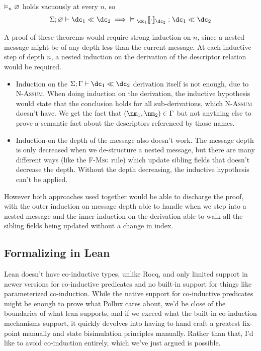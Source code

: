 \vspace{1em}
\begin{corollary}\label{cor:compat-sound}
  $\semjudg[n]{\emptyset}$ holds vacuously at every $n$, so
  \[ \judg{\emptyset}{\dc_1 \dcompat \dc_2} \implies\ \semjudg{ \coercion{\dc_1}{\cdot}{\dc_2} : \dc_1
      \dcompat \dc_2} \]
\end{corollary}

A proof of these theorems would require strong induction on $n$, since a nested
message might be of any depth less than the current message. At each inductive
step of depth $n$, a nested induction on the derivation of the descriptor
relation would be required.

\begin{itemize}
\item Induction on the $\judg{\Gamma}{\dc_1 \dcompat \dc_2}$ derivation itself is not enough, due to
  \textsc{N-Assum}. When doing induction on the derivation, the inductive
  hypothesis would state that the conclusion holds for all sub-derivations,
  which \textsc{N-Assum} doesn't have. We get the fact that $(\nm_1, \nm_2) \in \Gamma$ but
  not anything else to prove a semantic fact about the descriptors referenced by
  those names.
\item Induction on the depth of the message also doesn't work. The message depth
  is only decreased when we de-structure a nested message, but there are many
  different ways (like the \textsc{F-Msg} rule) which update sibling
  fields that doesn't decrease the depth. Without the depth decreasing, the
  inductive hypothesis can't be applied.
\end{itemize}
However both approaches used together would be able to discharge the proof, with
the outer induction on message depth able to handle when we step into a nested
message and the inner induction on the derivation able to walk all the sibling
fields being updated without a change in index.

\subsection{Formalizing in Lean}\label{sec:log-rel-lean}

Lean doesn't have co-inductive types, unlike Rocq, and only limited support in
newer versions for co-inductive predicates and no built-in support for things
like parameterized co-induction. While the native support for co-inductive
predicates might be enough to prove what Pollux cares about, we'd be close of
the boundaries of what lean supports, and if we exceed what the built-in
co-induction mechanisms support, it quickly devolves into having to hand craft
a greatest fix-point manually and state bisimulation principles manually. Rather
than that, I'd like to avoid co-induction entirely, which we've just argued is
possible.

